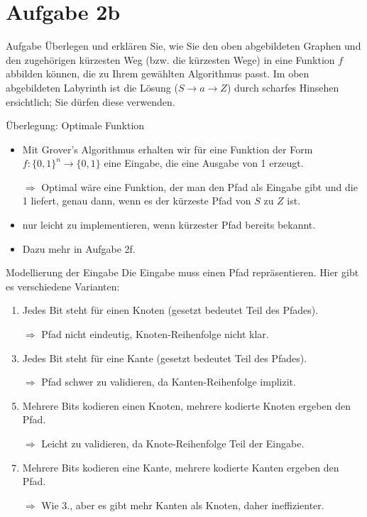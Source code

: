 \documentclass[fleqn,compress,utf8,aspectratio=169,t]{beamer}
\begin{document}
\section{Aufgabe 2b}

\begin{frame}{Aufgabe}
Überlegen und erklären Sie, wie Sie den oben abgebildeten Graphen und den zugehörigen kürzesten Weg (bzw. die kürzesten Wege) in eine Funktion $f$ abbilden können, die zu Ihrem gewählten Algorithmus passt. Im oben abgebildeten Labyrinth ist die Lösung ($S \rightarrow a \rightarrow Z$) durch scharfes Hinsehen ersichtlich; Sie dürfen diese verwenden.
\end{frame}

\begin{frame}{Überlegung: Optimale Funktion}
\begin{itemize}
	\item Mit Grover's Algorithmus erhalten wir für eine Funktion der Form $f: \{0, 1\}^n \rightarrow \{0, 1\}$ eine Eingabe, die eine Ausgabe von 1 erzeugt.
	\item[$\Rightarrow$] Optimal wäre eine Funktion, der man den Pfad als Eingabe gibt und die 1 liefert, genau dann, wenn es der kürzeste Pfad von $S$ zu $Z$ ist.
	\item nur leicht zu implementieren, wenn kürzester Pfad bereits bekannt.
	\item Dazu mehr in Aufgabe 2f.
\end{itemize}
\end{frame}

\begin{frame}{Modellierung der Eingabe}
Die Eingabe muss einen Pfad repräsentieren. Hier gibt es verschiedene Varianten:
\begin{enumerate}
	\item Jedes Bit steht für einen Knoten (gesetzt bedeutet Teil des Pfades).
	\item[] $\Rightarrow$ Pfad nicht eindeutig, Knoten-Reihenfolge nicht klar.
	\item Jedes Bit steht für eine Kante (gesetzt bedeutet Teil des Pfades).
	\item[] $\Rightarrow$ Pfad schwer zu validieren, da Kanten-Reihenfolge implizit.
	\item Mehrere Bits kodieren einen Knoten, mehrere kodierte Knoten ergeben den Pfad.
	\item[] $\Rightarrow$ Leicht zu validieren, da Knote-Reihenfolge Teil der Eingabe.
	\item Mehrere Bits kodieren eine Kante, mehrere kodierte Kanten ergeben den Pfad.
	\item[] $\Rightarrow$ Wie 3., aber es gibt mehr Kanten als Knoten, daher ineffizienter.
\end{enumerate}
\end{frame}
\end{document}
